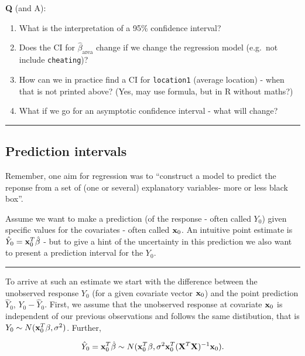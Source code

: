\documentclass[
]{article}
\providecommand{\tightlist}{%
  \setlength{\itemsep}{0pt}\setlength{\parskip}{0pt}}
\begin{document}
\textbf{Q} (and A):

\begin{enumerate}
\def\labelenumi{\arabic{enumi}.}
\tightlist
\item
  What is the interpretation of a 95\% confidence interval?
\item
  Does the CI for \(\hat{\beta}_{\text{area}}\) change if we change the
  regression model (e.g.~not include \texttt{cheating})?
\item
  How can we in practice find a CI for \texttt{location1} (average
  location) - when that is not printed above? (Yes, may use formula, but
  in R without maths?)
\item
  What if we go for an asymptotic confidence interval - what will
  change?
\end{enumerate}

\begin{center}\rule{0.5\linewidth}{0.5pt}\end{center}

\hypertarget{prediction-intervals}{%
\subsection{Prediction intervals}\label{prediction-intervals}}

Remember, one aim for regression was to ``construct a model to predict
the reponse from a set of (one or several) explanatory variables- more
or less black box''.

Assume we want to make a prediction (of the response - often called
\(Y_0\)) given specific values for the covariates - often called
\({\bf x}_0\). An intuitive point estimate is
\(\hat{Y}_0={\bf x}_0^T \hat{\beta}\) - but to give a hint of the
uncertainty in this prediction we also want to present a prediction
interval for the \(Y_0\).

\begin{center}\rule{0.5\linewidth}{0.5pt}\end{center}

To arrive at such an estimate we start with the difference between the
unobserved response \(Y_0\) (for a given covariate vector \({\bf x}_0\))
and the point prediction \(\hat{Y}_0\), \(Y_0-\hat{Y}_0\). First, we
assume that the unobserved response at covariate \({\bf x}_0\) is
independent of our previous observations and follows the same
distibution, that is \(Y_0 \sim N({\bf x}_0^T \beta,\sigma^2)\).
Further,

\[\hat{Y}_0={\bf x}_0^T \hat{\beta} \sim N({\bf x}_0^T \beta,\sigma^2 {\bf x}_0^T({\bf X}^T{\bf X})^{-1}{\bf x}_0).\]
\end{document}
